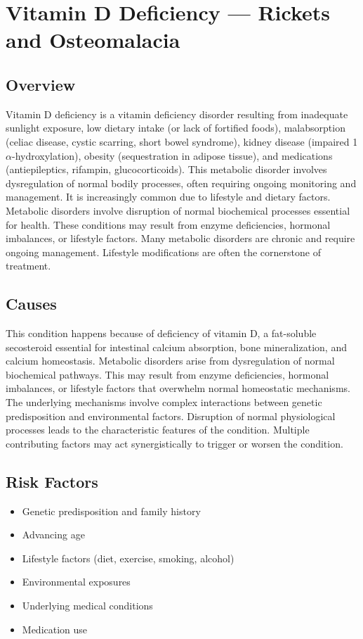 \chapter{Vitamin D Deficiency --- Rickets and Osteomalacia}
\label{sec:Vitamin D Deficiency}

\section{Overview}
Vitamin D deficiency is a vitamin deficiency disorder resulting from inadequate sunlight exposure, low dietary intake (or lack of fortified foods), malabsorption (celiac disease, cystic scarring, short bowel syndrome), kidney disease (impaired 1$\alpha$-hydroxylation), obesity (sequestration in adipose tissue), and medications (antiepileptics, rifampin, glucocorticoids). This metabolic disorder involves dysregulation of normal bodily processes, often requiring ongoing monitoring and management. It is increasingly common due to lifestyle and dietary factors. Metabolic disorders involve disruption of normal biochemical processes essential for health. These conditions may result from enzyme deficiencies, hormonal imbalances, or lifestyle factors. Many metabolic disorders are chronic and require ongoing management. Lifestyle modifications are often the cornerstone of treatment.
\section{Causes}
This condition happens because of deficiency of vitamin D, a fat-soluble secosteroid essential for intestinal calcium absorption, bone mineralization, and calcium homeostasis. Metabolic disorders arise from dysregulation of normal biochemical pathways. This may result from enzyme deficiencies, hormonal imbalances, or lifestyle factors that overwhelm normal homeostatic mechanisms. The underlying mechanisms involve complex interactions between genetic predisposition and environmental factors. Disruption of normal physiological processes leads to the characteristic features of the condition. Multiple contributing factors may act synergistically to trigger or worsen the condition.
\section{Risk Factors}
\begin{itemize}[noitemsep]
  \item Genetic predisposition and family history
  \item Advancing age
  \item Lifestyle factors (diet, exercise, smoking, alcohol)
  \item Environmental exposures
  \item Underlying medical conditions
  \item Medication use
\end{itemize}
